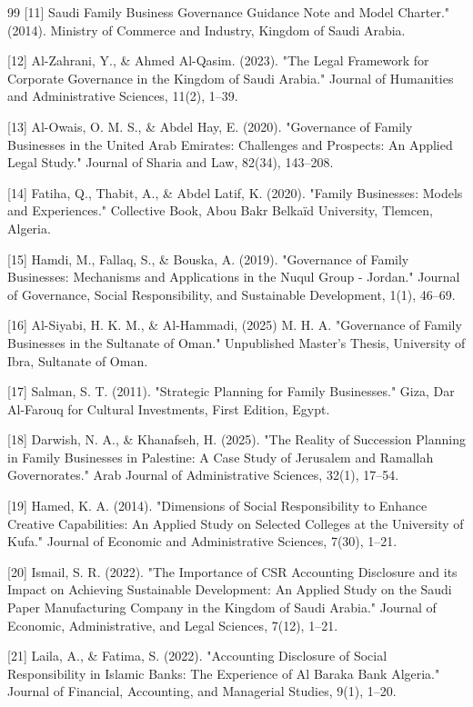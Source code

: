 \documentclass[10pt]{NSP1}
\begin{document}
\begin{thebibliography}{99}
[11] Saudi Family Business Governance Guidance Note and Model Charter." (2014). Ministry of Commerce and Industry, Kingdom of Saudi Arabia.

[12] Al-Zahrani, Y., \& Ahmed Al-Qasim. (2023). "The Legal Framework for Corporate Governance in the Kingdom of Saudi Arabia." Journal of Humanities and Administrative Sciences, 11(2), 1–39.

[13] Al-Owais, O. M. S., \& Abdel Hay, E. (2020). "Governance of Family Businesses in the United Arab Emirates: Challenges and Prospects: An Applied Legal Study." Journal of Sharia and Law, 82(34), 143–208.

[14] Fatiha, Q., Thabit, A., \& Abdel Latif, K. (2020). "Family Businesses: Models and Experiences." Collective Book, Abou Bakr Belkaïd University, Tlemcen, Algeria.

[15] Hamdi, M., Fallaq, S., \& Bouska, A. (2019). "Governance of Family Businesses: Mechanisms and Applications in the Nuqul Group - Jordan." Journal of Governance, Social Responsibility, and Sustainable Development, 1(1), 46–69.

[16] Al-Siyabi, H. K. M., \& Al-Hammadi, (2025) M. H. A. "Governance of Family Businesses in the Sultanate of Oman." Unpublished Master's Thesis, University of Ibra, Sultanate of Oman.

[17] Salman, S. T. (2011). "Strategic Planning for Family Businesses." Giza, Dar Al-Farouq for Cultural Investments, First Edition, Egypt.

[18] Darwish, N. A., \& Khanafseh, H. (2025). "The Reality of Succession Planning in Family Businesses in Palestine: A Case Study of Jerusalem and Ramallah Governorates." Arab Journal of Administrative Sciences, 32(1), 17–54.

[19] Hamed, K. A. (2014). "Dimensions of Social Responsibility to Enhance Creative Capabilities: An Applied Study on Selected Colleges at the University of Kufa." Journal of Economic and Administrative Sciences, 7(30), 1–21.

[20] Ismail, S. R. (2022). "The Importance of CSR Accounting Disclosure and its Impact on Achieving Sustainable Development: An Applied Study on the Saudi Paper Manufacturing Company in the Kingdom of Saudi Arabia." Journal of Economic, Administrative, and Legal Sciences, 7(12), 1–21.

[21] Laila, A., \& Fatima, S. (2022). "Accounting Disclosure of Social Responsibility in Islamic Banks: The Experience of Al Baraka Bank Algeria." Journal of Financial, Accounting, and Managerial Studies, 9(1), 1–20.


\end{thebibliography}
\end{document}
